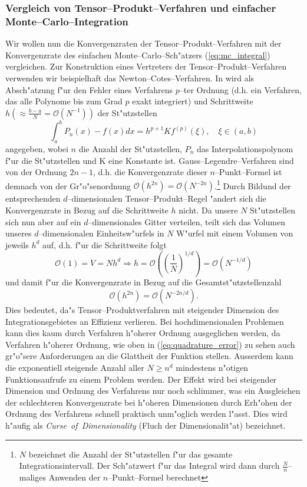 	\subsubsection{Vergleich von Tensor--Produkt--Verfahren und einfacher Monte--Carlo--Integration}\label{subsec:integrationsproblem_comparison}
	Wir wollen nun die Konvergenzraten der Tensor--Produkt--Verfahren mit der Konvergenzrate des einfachen Monte--Carlo--Sch"atzers (\ref{eq:mc_integral}) vergleichen. Zur Konstruktion eines Vertreters der Tensor--Produkt--Verfahren verwenden wir beispielhaft das Newton--Cotes--Verfahren. In \citep[][3.1.4]{Stoer:2005p10586} wird als Absch"atzung f"ur den Fehler eines Verfahrens $p$--ter Ordnung (d.h. ein Verfahren, das alle Polynome bis zum Grad $p$ exakt integriert) und Schrittweite $h(\approx\frac{b-a}{N}=\mathcal{O}(N^{-1}))$ der St"utzstellen
	\begin{equation}
		\int_a^b P_n(x)-f(x)dx=h^{p+1}K f^{(p)}(\xi),\quad\xi\in(a,b)
		\label{eq:quadrature_error}
	\end{equation}
	angegeben, wobei $n$ die Anzahl der St"utzstellen, $P_n$ das Interpolationspolynom f"ur die St"utzstellen und K eine Konstante ist. Gauss--Legendre--Verfahren sind von der Ordnung $2n-1$, d.h. die Konvergenzrate dieser $n$--Punkt--Formel ist demnach von der Gr"o"senordnung $\mathcal{O}(h^{2n})=\mathcal{O}(N^{-2n})$.\footnote{$N$ bezeichnet die Anzahl der St"utzstellen f"ur das gesamte Integrationsintervall. Der Sch"atzwert f"ur das Integral wird dann durch $\frac{N}{n}$--maliges Anwenden der $n$--Punkt--Formel berechnet}
	Durch Bildund der entsprechenden $d$--dimensionalen Tensor--Produkt--Regel "andert sich die Konvergenzrate in Bezug auf die Schrittweite $h$ nicht. Da unsere $N$ St"utzstellen sich nun aber auf ein $d$--dimensionales Gitter verteilen, teilt sich das Volumen unseres $d$--dimensionalen Einheitsw"urfels in $N$ W"urfel mit einem Volumen von jeweils $h^d$ auf, d.h. f"ur die Schrittweite folgt
	$$\mathcal{O}(1)=V=N h^d \Rightarrow h=\mathcal{O}\left(\left(\frac{1}{N}\right)^{1/d}\right)=\mathcal{O}\left(N^{-1/d}\right)$$	
	und damit f"ur die Konvergenzrate in Bezug auf die Gesamtst"utzstellenzahl
	$$\mathcal{O}(h^{2n})=\mathcal{O}(N^{-2n/d}).$$
	Dies bedeutet, da"s Tensor--Produktverfahren mit steigender Dimension des Integrationsgebietes an Effizienz verlieren. Bei hochdimensionalen Problemen kann dies kaum durch Verfahren h"oherer Ordnung ausgeglichen werden, da Verfahren h"oherer Ordnung, wie oben in (\ref{eq:quadrature_error}) zu sehen auch gr"o"sere Anforderungen an die Glattheit der Funktion stellen. Ausserdem kann die exponentiell steigende Anzahl aller $N \geq n^d$ mindestens n"otigen Funktionsaufrufe zu einem Problem werden. Der Effekt wird bei steigender Dimension und Ordnung des Verfahrens nur noch schlimmer, was ein Ausgleichen der schlechteren Konvergenzrate bei h"oheren Dimensionen durch Erh"ohen der Ordnung des Verfahrens schnell praktisch unm"oglich werden l"asst. Dies wird h"aufig als {\em Curse~of~Dimensionality} (Fluch der Dimensionalit"at) bezeichnet.
	
